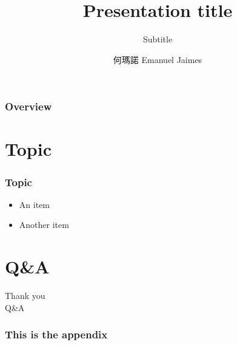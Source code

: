 \documentclass{beamer}
\title{Presentation title}
\subtitle{Subtitle}
\institute{Department of Mechanical Engineering}
\author{何瑪諾 Emanuel Jaimes}
\date{}
\begin{document}
\begin{frame}
  \titlepage
\end{frame}
  \begin{frame}
    \frametitle{Overview}
    \tableofcontents[pausesections]
  \end{frame}

  \section{Topic}
  \begin{frame}
    \frametitle{Topic}

    \begin{itemize}[<+->]
      \item An item
      \item Another item
    \end{itemize}
  \end{frame}


  \section{Q\&A}
  \begin{frame}
    \centering
    \LARGE{Thank you \\}
    \vspace{2em}
    \LARGE{Q\&A}
  \end{frame}

  \appendix
  \begin{frame}
    \frametitle{This is the appendix}
    \centering
  \end{frame}
\end{document}
